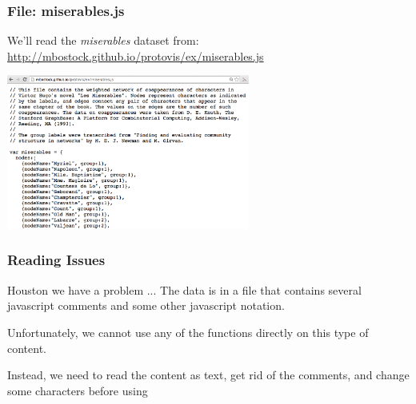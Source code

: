 \documentclass{beamer}\usepackage[]{graphicx}\usepackage[]{color}
\begin{document}

\begin{frame}
\frametitle{File: miserables.js}

We'll read the \textit{miserables} dataset from: \\
\url{http://mbostock.github.io/protovis/ex/miserables.js}

\begin{center}
\includegraphics[width=8cm]{images/miserables_js.png}
\end{center}

\end{frame}


\begin{frame}
\frametitle{Reading Issues}

\begin{block}{Houston we have a problem ...}
The data is in a file that contains several javascript comments and some other javascript notation.

\bigskip
Unfortunately, we cannot use any of the  functions directly on this type of content.

\bigskip
Instead, we need to read the content as text, get rid of the comments, and change some characters before using 
\end{block}

\end{frame}

\end{document}

